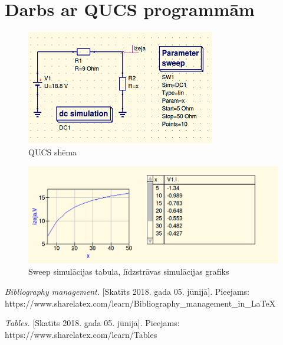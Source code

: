 \documentclass{report}
\begin{document}
\section{Darbs ar QUCS programmām}
\begin{figure}[!h]
    \centering
    \includegraphics[width=\textwidth, height=\textheight, keepaspectratio]{qucs02sch.png}
    \caption{QUCS shēma}
    \label{fig:2.3}
    \end{figure}
 
\begin{figure}[t] 
\centering
    \includegraphics[width=\textwidth, height=220 pt, keepaspectratio]{qucskopa.png}
    \caption{Sweep simulācijas tabula, līdzstrāvas simulācijas grafiks}
    \label{fig:2.4}
\end{figure}

\newpage

\label{s_nobeigums}

\begin{thebibliography}{9}
\textit{Bibliography management.} [Skatīts 2018. gada 05. jūnijā].
Pieejams: https://www.sharelatex.com/learn/Bibliography\_{}management\_{}in\_{}LaTeX

\textit{Tables.} [Skatīts 2018. gada 05. jūnijā].
Pieejams: https://www.sharelatex.com/learn/Tables
 
\end{thebibliography}
\end{document}

